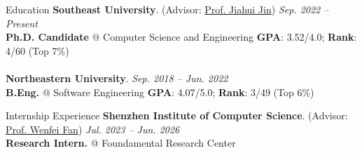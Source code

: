 \documentclass{cv} %
\newcommand{\mei}{\end{myitemize}\vspace{0.6ex}}
\begin{document}
\begin{rSection}[MITRed]{Education}
{\textbf{Southeast University}. (Advisor: \href{https://jujuhoo.github.io/}{Prof. Jiahui Jin})} \hfill {\em Sep. 2022 -- Present} 
\\ \textbf{Ph.D. Candidate} @ Computer Science and Engineering
\hfill { \textbf{GPA}: 3.52/4.0; \textbf{Rank}: 4/60 (Top 7\%)}
\\\\
{\textbf{Northeastern University}.} \hfill {\em Sep. 2018 -- Jun. 2022} 
\\ \textbf{B.Eng.} @ Software Engineering
\hfill { \textbf{GPA}: 4.07/5.0; \textbf{Rank}: 3/49 (Top 6\%)}
\end{rSection}

\begin{rSection}[MITRed]{Internship Experience}
{\bf Shenzhen Institute of Computer Science}. (Advisor: \href{https://homepages.inf.ed.ac.uk/wenfei/}{Prof. Wenfei Fan}) \hfill {\em Jul. 2023 -- Jun. 2026}\\
{\bf Research Intern.} @ Foundamental Research Center
\end{rSection}


\end{document}
